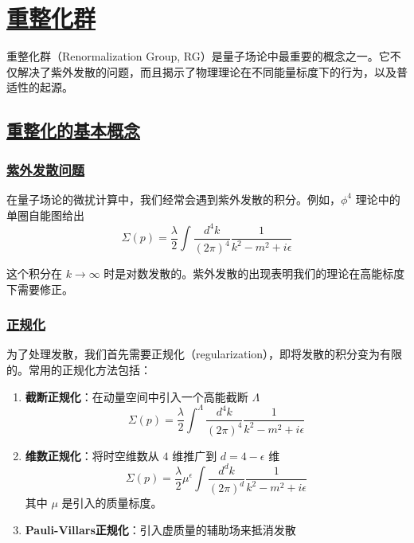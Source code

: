 \chapter{\protect\hyperlink{:}{重整化群}}

重整化群（Renormalization Group, RG）是量子场论中最重要的概念之一。它不仅解决了紫外发散的问题，而且揭示了物理理论在不同能量标度下的行为，以及普适性的起源。

\section{\protect\hyperlink{:}{重整化的基本概念}}

\subsection{\protect\hyperlink{:}{紫外发散问题}}

在量子场论的微扰计算中，我们经常会遇到紫外发散的积分。例如，$\phi^4$ 理论中的单圈自能图给出
\begin{equation}
    \Sigma(p) = \frac{\lambda}{2} \int \frac{d^4k}{(2\pi)^4} \frac{1}{k^2 - m^2 + i\epsilon}
\end{equation}

这个积分在 $k \to \infty$ 时是对数发散的。紫外发散的出现表明我们的理论在高能标度下需要修正。

\subsection{\protect\hyperlink{:}{正规化}}

为了处理发散，我们首先需要正规化（regularization），即将发散的积分变为有限的。常用的正规化方法包括：

\begin{enumerate}
    \item \textbf{截断正规化}：在动量空间中引入一个高能截断 $\Lambda$
    \begin{equation}
        \Sigma(p) = \frac{\lambda}{2} \int^{\Lambda} \frac{d^4k}{(2\pi)^4} \frac{1}{k^2 - m^2 + i\epsilon}
    \end{equation}
    
    \item \textbf{维数正规化}：将时空维数从 $4$ 维推广到 $d = 4 - \epsilon$ 维
    \begin{equation}
        \Sigma(p) = \frac{\lambda}{2} \mu^{\epsilon} \int \frac{d^dk}{(2\pi)^d} \frac{1}{k^2 - m^2 + i\epsilon}
    \end{equation}
    其中 $\mu$ 是引入的质量标度。
    
    \item \textbf{Pauli-Villars正规化}：引入虚质量的辅助场来抵消发散
\end{enumerate}

